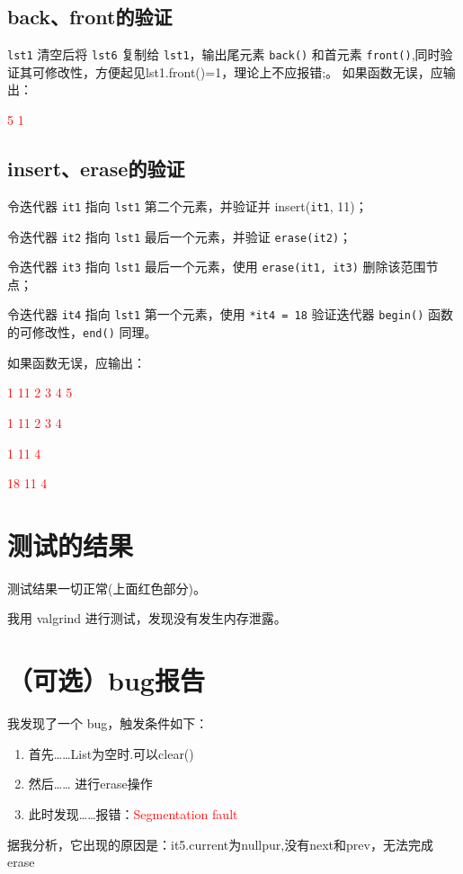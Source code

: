 \documentclass[UTF8]{ctexart}
\begin{document}
\subsection{back、front的验证}
\texttt{lst1} 清空后将 \texttt{lst6} 复制给 \texttt{lst1}，输出尾元素 \texttt{back()} 和首元素 \texttt{front()},同时验证其可修改性，方便起见lst1.front()=1，理论上不应报错;。  
如果函数无误，应输出：

\textcolor{red}{5 1}

\subsection{insert、erase的验证}
令迭代器 \texttt{it1} 指向 \texttt{lst1} 第二个元素，并验证并 insert(\texttt{it1}, 11)； 

令迭代器 \texttt{it2} 指向 \texttt{lst1} 最后一个元素，并验证 \texttt{erase(it2)}； 

令迭代器 \texttt{it3} 指向 \texttt{lst1} 最后一个元素，使用 \texttt{erase(it1, it3)} 删除该范围节点；

令迭代器 \texttt{it4} 指向 \texttt{lst1} 第一个元素，使用 \texttt{*it4 = 18} 验证迭代器 \texttt{begin()} 函数的可修改性，\texttt{end()} 同理。  

如果函数无误，应输出： 

\textcolor{red}{1 11 2 3 4 5} 

\textcolor{red}{1 11 2 3 4} 

\textcolor{red}{1 11 4} 

\textcolor{red}{18 11 4}


\section{测试的结果}

测试结果一切正常(上面红色部分)。

我用 valgrind 进行测试，发现没有发生内存泄露。

\section{（可选）bug报告}

我发现了一个 bug，触发条件如下：

\begin{enumerate}
    \item 首先……\qquad List为空时.可以clear()
    \item 然后…… \qquad 进行erase操作 
    \item 此时发现……报错：\textcolor{red}{Segmentation fault}
\end{enumerate}


据我分析，它出现的原因是：it5.current为nullpur,没有next和prev，无法完成erase
\end{document}
